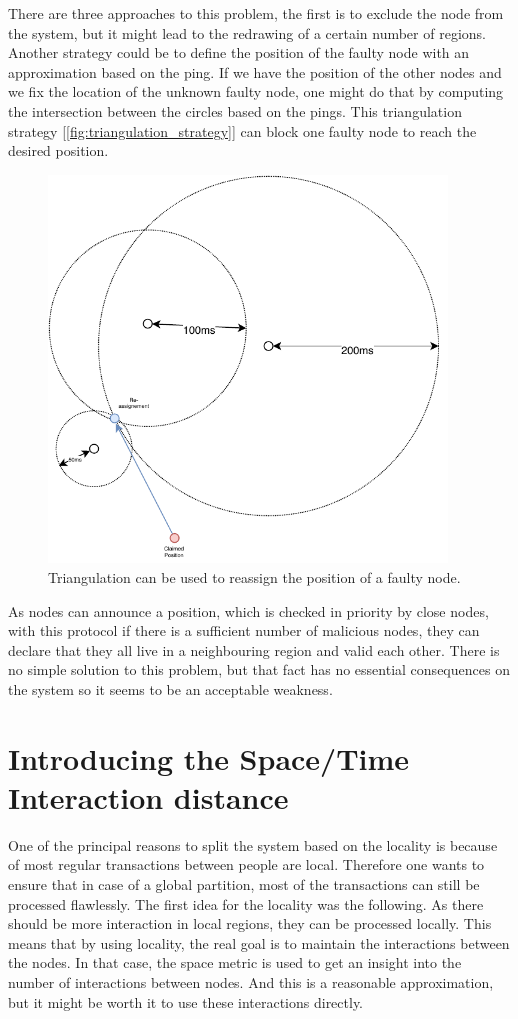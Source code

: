 \documentclass[a4paper,11pt,twoside=semi,openright]{report}
\begin{document}
There are three approaches to this problem, the first is to exclude the node
from the system, but it might lead to the redrawing of a certain number of
regions. Another strategy could be to define the position of the faulty node
with an approximation based on the ping. If we have the position of the other
nodes and we fix the location of the unknown faulty node, one might do
that by computing the intersection between the circles based on the pings. This
triangulation strategy [\autoref{fig:triangulation_strategy}] can block one
faulty node to reach the desired position. 

\begin{figure}[!h] \centering
  \includegraphics[width=300pt]{figures/triangulation_strategy}
  \caption{Triangulation can be used to reassign the position of a faulty
  node. }
\label{fig:triangulation_strategy}
\end{figure}

As nodes can announce a position, which is checked in priority by close
nodes, with this protocol if there is a sufficient number of malicious nodes,
they can declare that they all live in a neighbouring region and valid each other.
There is no simple solution to this problem, but that fact has no essential consequences
on the system so it seems to be an acceptable weakness.

\section{Introducing the Space/Time Interaction distance}
One of the principal reasons to split the system based on the locality is
because of most regular transactions between people are local. Therefore one
wants to ensure that in case of a global partition, most of the transactions
can still be processed flawlessly. The first idea for the locality was the
following. As there should be more interaction in local regions, they can be processed locally. This means that by using locality, the
real goal is to maintain the interactions between the nodes. In that case,
the space metric is used to get an insight into the number of interactions
between nodes. And this is a reasonable approximation, but it might be worth it
to use these interactions directly. 
\end{document}
